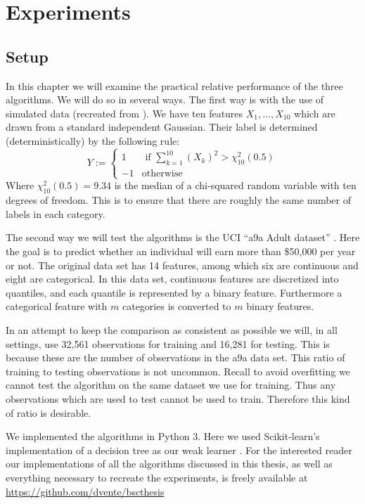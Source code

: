 


\chapter{Experiments}
\label{chap:pracPerf}
\section{Setup}
\label{sec:Setup}
In this chapter we will examine the practical relative performance of the three algorithms. We will do so in several ways. The first way is with the use of simulated data (recreated from \cite{Hastie2009}). We have ten features $X_1,\ldots,X_{10}$ which are drawn from a standard independent Gaussian. Their label is determined (deterministically) by the following rule: $$Y:=\begin{cases}
1 & \text{ if } \sum_{k=1}^{10} (X_k)^2 > \chi_{10}^2(0.5)\\
-1 & \text{otherwise}
\end{cases}$$ Where $\chi_{10}^2(0.5)=9.34$ is the median of a chi-squared random variable with ten degrees of freedom. This is to ensure that there are roughly the same number of labels in each category. 

\par The second way we will test the algorithms is the UCI ``a9a Adult dataset'' \cite{LIBSVM}. Here the goal is to predict whether an individual will earn more than \$50,000 per year or not. The original data set has 14 features, among which six are continuous and eight are categorical. In this data set, continuous features are discretized into quantiles, and each quantile is represented by a binary feature. Furthermore a categorical feature with $m$ categories is converted to $m$ binary features. 

\par In an attempt to keep the comparison as consistent as possible we will, in all settings, use 32,561 observations for training and 16,281 for testing. This is because these are the number of observations in the a9a data set. This ratio of training to testing observations is not uncommon. Recall to avoid overfitting we cannot test the algorithm on the same dataset we use for training. Thus any observations which are used to test cannot be used to train. Therefore this kind of ratio is desirable.

\par We implemented the algorithms in Python 3. Here we used Scikit-learn's implementation of a decision tree as our weak learner \cite{Pedregosa2012}. For the interested reader our implementations of all the algorithms discussed in this thesis, as well as everything necessary to recreate the experiments, is freely available at \url{https://github.com/dvente/bscthesis} 


